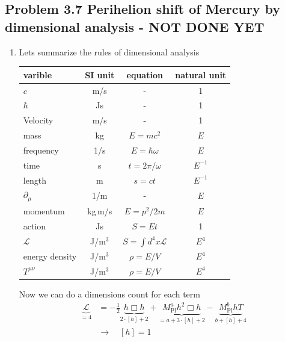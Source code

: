 \documentclass[10pt,a4paper]{book}
\theoremstyle{definition}
\begin{document}
\subsection{Problem 3.7 Perihelion shift of Mercury by dimensional analysis - NOT DONE YET}
\begin{enumerate}[label=(\alph*)]
\item Lets summarize the rules of dimensional analysis 

\begin{center}
\begin{tabular}{ lccc } 
 \hline
 varible & SI unit &equation & natural unit \\ 
 \hline\hline
 $c$               & m/s    & -                        & 1        \\
 $\hbar$           & Js     & -                        & 1        \\
 Velocity          & m/s    & -                        & 1      \\
 mass              & kg     & $E=mc^2$                 & $E$      \\
 frequency         & 1/s    & $E=\hbar\omega$          & $E$      \\
 time              & s      & $t=2\pi/\omega$          & $E^{-1}$ \\
 length            & m      & $s=ct$                   & $E^{-1}$ \\
 $\partial_\mu$    & 1/m    & -                        & $E$      \\
 momentum          & kg\,m/s& $E=p^2/2m$               & $E$      \\
 action            & Js     & $S=Et$                   & 1        \\
 $\mathcal{L}$     & J/m$^3$& $S=\int d^4x\mathcal{L}$ & $E^4$    \\
 energy density    & J/m$^3$& $\rho=E/V$               & $E^4$    \\
 $T^{\mu\nu}$      & J/m$^3$& $\rho=E/V$               & $E^4$    \\
 \hline
\end{tabular}
\end{center}
Now we can do a dimensions count for each term
\begin{align}
\underbrace{\mathcal{L}}_{=4}&=-\frac{1}{2}\underbrace{h\Box h}_{2\cdot[h]+2}+ \underbrace{M_\text{Pl}^a h^2\Box h}_{=a+3\cdot[h]+2}-\underbrace{M_\text{Pl}^bhT}_{b+[h]+4}\\
&\rightarrow\quad[h]=1\\

\end{align}
\end{enumerate}
\end{document}
